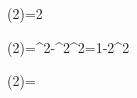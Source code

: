\sin(2\theta)=2\sin\theta\cos\theta

\cos(2\theta)=\cos^2\theta-\sin^2\cos^2=1-2\sin^2\theta

\tan(2\theta)=
